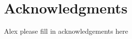 \documentclass[fleqn,10pt]{Stylesheet} %
\begin{document}
\section*{Acknowledgments} %

Alex please fill in acknowledgements here 



\end{document}
